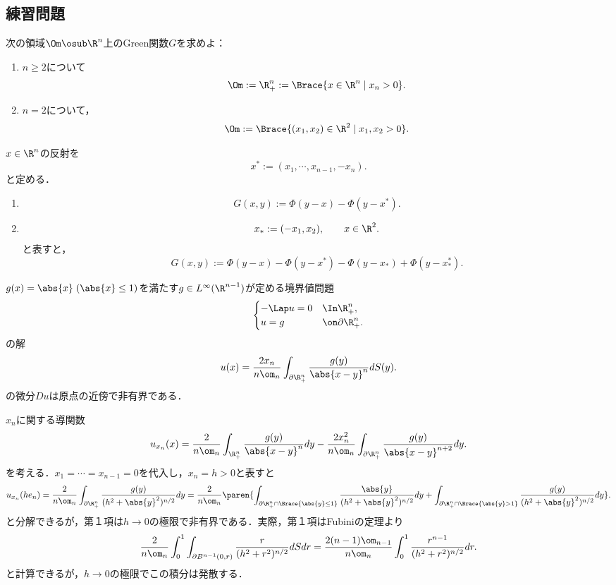 \documentclass[uplatex,dvipdfmx]{jsreport}
\begin{document}
\subsection{練習問題}

\begin{problem}[Green関数を求め方]
    次の領域$\Om\osub\R^n$上のGreen関数$G$を求めよ：
    \begin{enumerate}
        \item $n\ge2$について
        \[\Om:=\R^n_+:=\Brace{x\in\R^n\mid x_n>0}.\]
        \item $n=2$について，
        \[\Om:=\Brace{(x_1,x_2)\in\R^2\mid x_1,x_2>0}.\]
    \end{enumerate}
\end{problem}
\begin{Proof}[\underline{\bf【解】}]
    $x\in\R^n$の反射を
    \[x^*:=(x_1,\cdots,x_{n-1},-x_n).\]
    と定める．
    \begin{enumerate}
        \item \[G(x,y):=\Phi(y-x)-\Phi(y-x^*).\]
        \item 
        \[x_*:=(-x_1,x_2),\qquad x\in\R^2.\]
        と表すと，
        \[G(x,y):=\Phi(y-x)-\Phi(y-x^*)-\Phi(y-x_*)+\Phi(y-x^*_*).\]
    \end{enumerate}
\end{Proof}

\begin{problem}[上半平面上のPoisson核の性質]
    $g(x)=\abs{x}\;(\abs{x}\le1)$を満たす$g\in L^\infty(\R^{n-1})$が定める境界値問題
    \[\begin{cases}
        -\Lap u=0&\In\R^n_+,\\
        u=g&\on\partial\R^n_+.
    \end{cases}\]
    の解
    \[u(x)=\frac{2x_n}{n\om_n}\int_{\partial\R^n_+}\frac{g(y)}{\abs{x-y}^n}dS(y).\]
    の微分$Du$は原点の近傍で非有界である．
\end{problem}
\begin{Proof}[\underline{\bf【解】}]
    $x_n$に関する導関数
    \[u_{x_n}(x)=\frac{2}{n\om_n}\int_{\R^n_+}\frac{g(y)}{\abs{x-y}^n}dy-\frac{2x_n^2}{n\om_n}\int_{\partial\R^n_+}\frac{g(y)}{\abs{x-y}^{n+2}}dy.\]
    を考える．$x_1=\cdots=x_{n-1}=0$を代入し，$x_n=h>0$と表すと
    \[u_{x_n}(he_n)=\frac{2}{n\om_n}\int_{\partial\R^n_+}\frac{g(y)}{(h^2+\abs{y}^2)^{n/2}}dy=\frac{2}{n\om_n}\paren{\int_{\partial\R^n_+\cap\Brace{\abs{y}\le1}}\frac{\abs{y}}{(h^2+\abs{y}^2)^{n/2}}dy+\int_{\partial\R^n_+\cap\Brace{\abs{y}>1}}\frac{g(y)}{(h^2+\abs{y}^2)^{n/2}}dy}.\]
    と分解できるが，第１項は$h\to0$の極限で非有界である．実際，第１項はFubiniの定理より
    \[\frac{2}{n\om_n}\int^1_0\int_{\partial B^{n-1}(0,r)}\frac{r}{(h^2+r^2)^{n/2}}dSdr=\frac{2(n-1)\om_{n-1}}{n\om_n}\int^1_0\frac{r^{n-1}}{(h^2+r^2)^{n/2}}dr.\]
    と計算できるが，$h\to0$の極限でこの積分は発散する．
\end{Proof}
\end{document}
